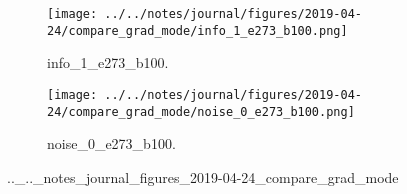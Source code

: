 \begin{figure}[!htbp]
\begin{subfigure}[t]{0.48\textwidth}
   \texttt{[image: ../../notes/journal/figures/2019-04-24/compare\_grad\_mode/info\_1\_e273\_b100.png]}
   \caption{info_1_e273_b100.}
   \label{fig:.._.._notes_journal_figures_2019-04-24_compare_grad_mode-h}
\end{subfigure}
\begin{subfigure}[t]{0.48\textwidth}
   \texttt{[image: ../../notes/journal/figures/2019-04-24/compare\_grad\_mode/noise\_0\_e273\_b100.png]}
   \caption{noise_0_e273_b100.}
   \label{fig:.._.._notes_journal_figures_2019-04-24_compare_grad_mode-i}
\end{subfigure}
   \caption{.._.._notes_journal_figures_2019-04-24_compare_grad_mode}
   \label{fig:.._.._notes_journal_figures_2019-04-24_compare_grad_mode}
\end{figure}